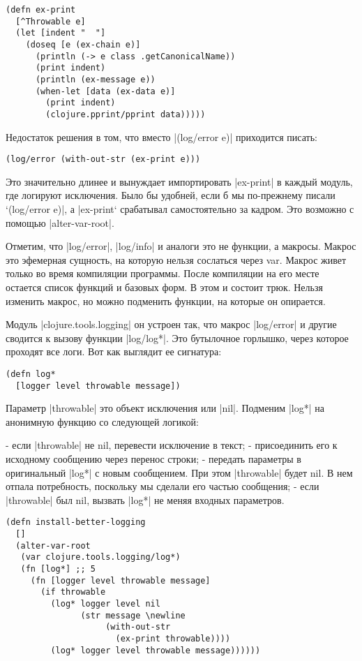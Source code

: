 \begin{verbatim}
(defn ex-print
  [^Throwable e]
  (let [indent "  "]
    (doseq [e (ex-chain e)]
      (println (-> e class .getCanonicalName))
      (print indent)
      (println (ex-message e))
      (when-let [data (ex-data e)]
        (print indent)
        (clojure.pprint/pprint data)))))
\end{verbatim}

Недостаток решения в том, что вместо \spverb|(log/error e)| приходится писать:

\begin{verbatim}
(log/error (with-out-str (ex-print e)))
\end{verbatim}

Это значительно длинее и вынуждает импортировать \spverb|ex-print| в каждый модуль, где
логируют исключения. Было бы удобней, если б мы по-прежнему писали `(log/error
e)\spverb|, а |ex-print` срабатывал самостоятельно за кадром. Это возможно с помощью
\spverb|alter-var-root|.

Отметим, что \spverb|log/error|, \spverb|log/info| и аналоги это не функции, а макросы. Макрос
это эфемерная сущность, на которую нельзя сослаться через var. Макрос живет
только во время компиляции программы. После компиляции на его месте остается
список функций и базовых форм. В этом и состоит трюк. Нельзя изменить макрос, но
можно подменить функции, на которые он опирается.

Модуль \spverb|clojure.tools.logging| он устроен так, что макрос \spverb|log/error| и другие
сводится к вызову функции \spverb|log/log*|. Это бутылочное горлышко, через которое
проходят все логи. Вот как выглядит ее сигнатура:

\begin{verbatim}
(defn log*
  [logger level throwable message])
\end{verbatim}

Параметр \spverb|throwable| это объект исключения или \spverb|nil|. Подменим \spverb|log*| на
анонимную функцию со следующей логикой:

- если \spverb|throwable| не nil, перевести исключение в текст;
- присоединить его к исходному сообщению через перенос строки;
- передать параметры в оригинальный \spverb|log*| с новым сообщением. При этом
  \spverb|throwable| будет nil. В нем отпала потребность, поскольку мы сделали его
  частью сообщения;
- если \spverb|throwable| был nil, вызвать \spverb|log*| не меняя входных параметров.

\begin{verbatim}
(defn install-better-logging
  []
  (alter-var-root
   (var clojure.tools.logging/log*)
   (fn [log*] ;; 5
     (fn [logger level throwable message]
       (if throwable
         (log* logger level nil
               (str message \newline
                    (with-out-str
                      (ex-print throwable))))
         (log* logger level throwable message))))))
\end{verbatim}

